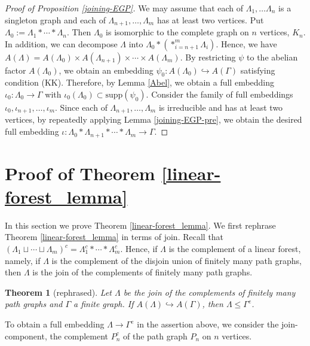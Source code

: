 \documentclass{amsart}
\theoremstyle{definition}
\theoremstyle{plain}
\newtheorem{theorem}[definition]{Theorem}
\numberwithin{equation}{section}
\begin{document}
\begin{proof}[Proof of Proposition \ref{joining-EGP}]
We may assume that each of $\Lambda_1, \ldots \Lambda_n$ is a singleton graph and each of $\Lambda_{n+1}, \ldots, \Lambda_{m}$ has at least two vertices. 
Put $\Lambda_0:= \Lambda_1 * \cdots * \Lambda_n$. 
Then $\Lambda_0$ is isomorphic to the complete graph on $n$ vertices, $K_n$. 
In addition, we can decompose $\Lambda$ into $\Lambda_0 * (*_{i= n+1}^m \Lambda_i)$. 
Hence, we have $A(\Lambda) = A(\Lambda_0) \times A(\Lambda_{n+1}) \times \cdots \times A(\Lambda_m)$. 
By restricting $\psi$ to the abelian factor $A(\Lambda_0)$, we obtain an embedding $\psi_0 \colon A(\Lambda_0) \hookrightarrow A(\Gamma)$ satisfying condition (KK). 
Therefore, by Lemma \ref{Abel}, we obtain a full embedding $\iota_0: \Lambda_0 \rightarrow \Gamma$ with $\iota_0(\Lambda_0) \subset \mathrm{supp}(\psi_0)$. 
Consider the family of full embeddings $\iota_0, \iota_{n+1}, \ldots, \iota_{m}$. 
Since each of $\Lambda_{n+1}, \ldots, \Lambda_{m}$ is irreducible and has at least two vertices, by repeatedly applying Lemma \ref{joining-EGP-pre}, we obtain the desired full embedding $\iota \colon \Lambda_0 * \Lambda_{n+1} * \cdots * \Lambda_{m} \rightarrow \Gamma$. 
\end{proof}


\section{Proof of Theorem \ref{linear-forest_lemma} \label{the-linear-forest-lemma-sec}}
In this section we prove Theorem \ref{linear-forest_lemma}. 
We first rephrase Theorem \ref{linear-forest_lemma} in terms of join. 
Recall that $(\Lambda_1 \sqcup \cdots \sqcup \Lambda_m)^c = \Lambda_1^c * \cdots * \Lambda_m^c$. 
Hence, if $\Lambda$ is the complement of a linear forest, namely, if $\Lambda$ is the complement of the disjoin union of finitely many path graphs, then $\Lambda$ is the join of the complements of finitely many path graphs. 

\begin{theorem}[rephrased]
Let $\Lambda$ be the join of the complements of finitely many path graphs and $\Gamma$ a finite graph. 
If $A(\Lambda) \hookrightarrow A(\Gamma)$, then $\Lambda \leq \Gamma^e$. 
\label{linear-forest_lemma_reph}
\end{theorem}

To obtain a full embedding $\Lambda \rightarrow \Gamma^e$ in the assertion above, we consider the join-component, the complement $P_n^c$ of the path graph $P_n$ on $n$ vertices. 
\end{document}
